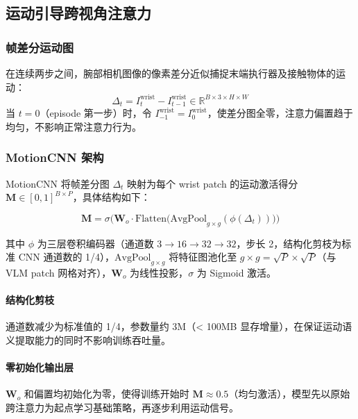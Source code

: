 \documentclass[10pt,twocolumn]{article}
\begin{document}
\subsection{运动引导跨视角注意力}
\label{sec:method:mgca}

\subsubsection{帧差分运动图}

在连续两步之间，腕部相机图像的像素差分近似捕捉末端执行器及接触物体的运动：
\begin{equation}
  \Delta_t = I_t^{\text{wrist}} - I_{t-1}^{\text{wrist}} \in \mathbb{R}^{B \times 3 \times H \times W}
  \label{eq:delta}
\end{equation}
当 $t=0$（episode 第一步）时，令 $I_{-1}^{\text{wrist}} = I_0^{\text{wrist}}$，使差分图全零，注意力偏置趋于均匀，不影响正常注意力行为。

\subsubsection{MotionCNN 架构}

MotionCNN 将帧差分图 $\Delta_t$ 映射为每个 wrist patch 的运动激活得分 $\mathbf{M} \in [0,1]^{B \times P}$，具体结构如下：

\begin{equation}
  \mathbf{M} = \sigma\!\bigl(\mathbf{W}_o \cdot \text{Flatten}\bigl(\text{AvgPool}_{g\times g}(\phi(\Delta_t))\bigr)\bigr)
  \label{eq:motioncnn}
\end{equation}

其中 $\phi$ 为三层卷积编码器（通道数 $3 \to 16 \to 32 \to 32$，步长 2，结构化剪枝为标准 CNN 通道数的 1/4），$\text{AvgPool}_{g \times g}$ 将特征图池化至 $g \times g = \sqrt{P} \times \sqrt{P}$（与 VLM patch 网格对齐），$\mathbf{W}_o$ 为线性投影，$\sigma$ 为 Sigmoid 激活。

\paragraph{结构化剪枝}
通道数减少为标准值的 1/4，参数量约 3M（< 100MB 显存增量），在保证运动语义提取能力的同时不影响训练吞吐量。

\paragraph{零初始化输出层}
$\mathbf{W}_o$ 和偏置均初始化为零，使得训练开始时 $\mathbf{M} \approx 0.5$（均匀激活），模型先以原始跨注意力为起点学习基础策略，再逐步利用运动信号。
\end{document}
